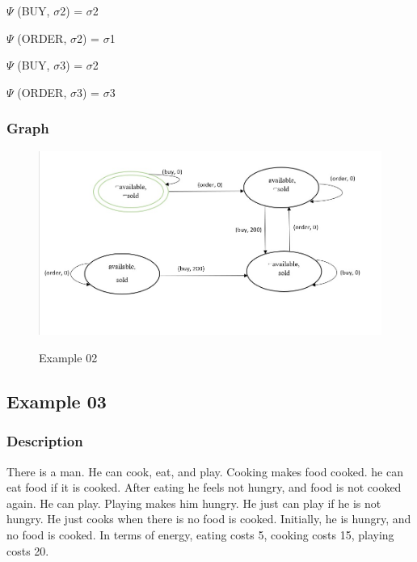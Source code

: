\documentclass[11pt]{article}
\begin{document}
	\(  \Psi  \)  (BUY, $ \sigma $2) = $ \sigma $2\par
	
	\(  \Psi  \)  (ORDER, $ \sigma $2) = $ \sigma $1\par
	
	\(  \Psi  \)  (BUY, $ \sigma $3) = $ \sigma $2\par
	
	\(  \Psi  \)  (ORDER, $ \sigma $3) = $ \sigma $3\par
	\subsubsection{Graph}\label{par:p402}
	\begin{figure}[H]
		\includegraphics[width=1\linewidth, height=0.4\textheight]{./media/image1.jpeg}
		\label{Figure:f02}
		\caption{Example 02}
	\end{figure}
	\subsection{Example 03}
	\subsubsection{Description}\label{par:p103}
	There is a man. He can cook, eat, and play. Cooking makes food cooked. he can eat food if it is cooked. After eating he feels not hungry, and food is not cooked again. He can play. Playing makes him hungry. He just can play if he is not hungry. He just cooks when there is no food is cooked. Initially, he is hungry, and no food is cooked. In terms of energy, eating costs 5, cooking costs 15, playing costs 20.\\
	\\
\end{document}
